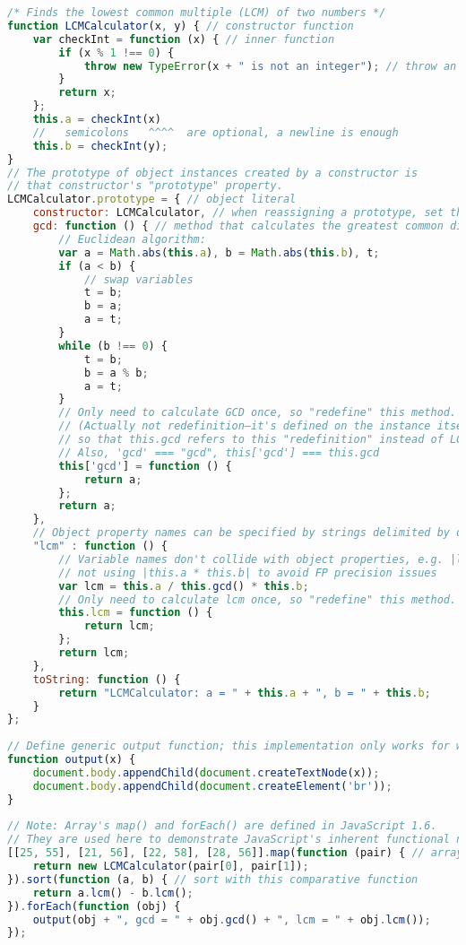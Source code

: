 \begin{lstlisting}[language=JavaScript]
/* Finds the lowest common multiple (LCM) of two numbers */
function LCMCalculator(x, y) { // constructor function
    var checkInt = function (x) { // inner function
        if (x % 1 !== 0) {
            throw new TypeError(x + " is not an integer"); // throw an exception
        }
        return x;
    };
    this.a = checkInt(x)
    //   semicolons   ^^^^  are optional, a newline is enough
    this.b = checkInt(y);
}
// The prototype of object instances created by a constructor is
// that constructor's "prototype" property.
LCMCalculator.prototype = { // object literal
    constructor: LCMCalculator, // when reassigning a prototype, set the constructor property appropriately
    gcd: function () { // method that calculates the greatest common divisor
        // Euclidean algorithm:
        var a = Math.abs(this.a), b = Math.abs(this.b), t;
        if (a < b) {
            // swap variables
            t = b;
            b = a;
            a = t;
        }
        while (b !== 0) {
            t = b;
            b = a % b;
            a = t;
        }
        // Only need to calculate GCD once, so "redefine" this method.
        // (Actually not redefinition—it's defined on the instance itself,
        // so that this.gcd refers to this "redefinition" instead of LCMCalculator.prototype.gcd.)
        // Also, 'gcd' === "gcd", this['gcd'] === this.gcd
        this['gcd'] = function () {
            return a;
        };
        return a;
    },
    // Object property names can be specified by strings delimited by double (") or single (') quotes.
    "lcm" : function () {
        // Variable names don't collide with object properties, e.g. |lcm| is not |this.lcm|.
        // not using |this.a * this.b| to avoid FP precision issues
        var lcm = this.a / this.gcd() * this.b;
        // Only need to calculate lcm once, so "redefine" this method.
        this.lcm = function () {
            return lcm;
        };
        return lcm;
    },
    toString: function () {
        return "LCMCalculator: a = " + this.a + ", b = " + this.b;
    }
};
 
// Define generic output function; this implementation only works for web browsers
function output(x) {
    document.body.appendChild(document.createTextNode(x));
    document.body.appendChild(document.createElement('br'));
}
 
// Note: Array's map() and forEach() are defined in JavaScript 1.6.
// They are used here to demonstrate JavaScript's inherent functional nature.
[[25, 55], [21, 56], [22, 58], [28, 56]].map(function (pair) { // array literal + mapping function
    return new LCMCalculator(pair[0], pair[1]);
}).sort(function (a, b) { // sort with this comparative function
    return a.lcm() - b.lcm();
}).forEach(function (obj) {
    output(obj + ", gcd = " + obj.gcd() + ", lcm = " + obj.lcm());
});
\end{lstlisting}

